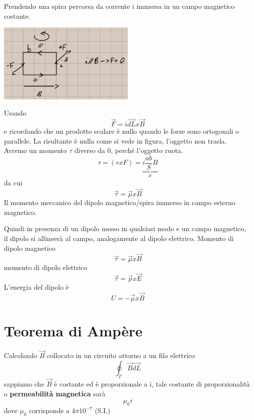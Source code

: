 \documentclass[a4paper, 12pt]{book}
\theoremstyle{plain}
\begin{document}
Prendendo una spira percorsa da corrente i immersa in un 
campo magnetico costante. 
\begin{center}
    \includegraphics[width=0.5\textwidth]{spira.jpg}
\end{center}
Usando \[ \vec{F} = i\vec{dL}x\vec{B} \] e ricordando 
che un prodotto scalare è nullo quando le forze sono 
ortogonali o parallele. La risultante è nulla come 
si vede in figura, l'oggetto non trasla. Avremo un momento 
$\tau$ diverso da 0, perché l'oggetto ruota.
\[ \tau = (rxF)  = \underbrace{i\frac{ab}{S}B}_\mu \] 
da cui \[ \vec{\tau} = \vec{\mu} x \vec{B} \] 
Il momento meccanico del dipolo magnetico/spira immerso 
in campo esterno magnetico.

Quindi in presenza di un dipolo messo in qualsiasi modo 
e un campo magnetico, il dipolo si allineerà al campo, 
analogamente al dipolo elettrico. Momento di dipolo 
magnetico \[ \vec{\tau} = \vec{\mu} x \vec{B} \] 
momento di dipolo elettrico 
\[ \vec{\tau} = \vec{p} x \vec{E} \]
L'energia del dipolo è \[ U = -\vec{\mu}x\vec{B} \] 

\section{Teorema di Ampère}

Calcolando $\vec{B}$ collocato in un circuito attorno 
a un filo elettrico \[ \oint_{\Gamma} \vec{B} \vec{dL} \] 
sappiamo che $\vec{B}$ è costante ed è proporzionale a i, 
tale costante di proporzionalità o \textbf{permeabilità magnetica}
sarà \[ \mu_0 i \] dove $\mu_0$ corrisponde a $4\pi10^{-7}$ (S.I.)
\end{document}

